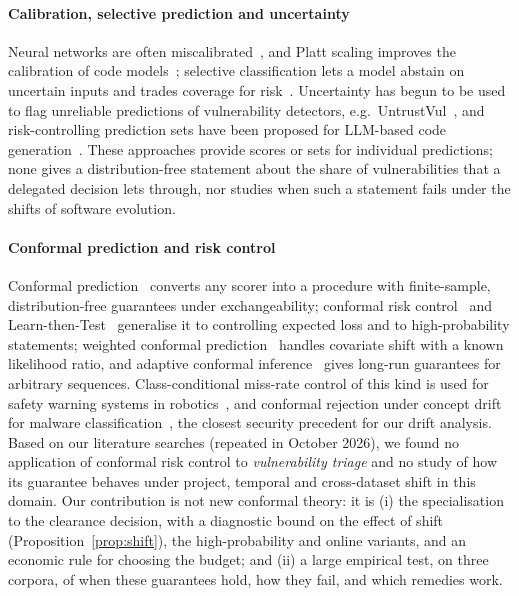 \paragraph{Calibration, selective prediction and uncertainty}
Neural networks are often miscalibrated~\cite{guo2017calibration}, and Platt scaling improves the calibration of code models~\cite{spiess2025calibration}; selective classification lets a model abstain on uncertain inputs and trades coverage for risk~\cite{geifman2017selective}. Uncertainty has begun to be used to flag unreliable predictions of vulnerability detectors, e.g.\ UntrustVul~\cite{tung2025untrustvul}, and risk-controlling prediction sets have been proposed for LLM-based code generation~\cite{xu2026riscoset}. These approaches provide scores or sets for individual predictions; none gives a distribution-free statement about the share of vulnerabilities that a delegated decision lets through, nor studies when such a statement fails under the shifts of software evolution.

\paragraph{Conformal prediction and risk control}
Conformal prediction~\cite{vovk2005algorithmic,shafer2008tutorial,angelopoulos2021gentle} converts any scorer into a procedure with finite-sample, distribution-free guarantees under exchangeability; conformal risk control~\cite{angelopoulos2023conformal} and Learn-then-Test~\cite{angelopoulos2021ltt} generalise it to controlling expected loss and to high-probability statements; weighted conformal prediction~\cite{tibshirani2019conformal} handles covariate shift with a known likelihood ratio, and adaptive conformal inference~\cite{gibbs2021adaptive} gives long-run guarantees for arbitrary sequences. Class-conditional miss-rate control of this kind is used for safety warning systems in robotics~\cite{luo2022sample}, and conformal rejection under concept drift for malware classification~\cite{barbero2022transcendent}, the closest security precedent for our drift analysis. Based on our literature searches (repeated in October 2026), we found no application of conformal risk control to \emph{vulnerability triage} and no study of how its guarantee behaves under project, temporal and cross-dataset shift in this domain. Our contribution is not new conformal theory: it is (i) the specialisation to the clearance decision, with a diagnostic bound on the effect of shift (Proposition~\ref{prop:shift}), the high-probability and online variants, and an economic rule for choosing the budget; and (ii) a large empirical test, on three corpora, of when these guarantees hold, how they fail, and which remedies work.

